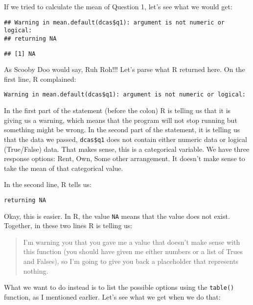 \documentclass[]{article}
\newenvironment{Shaded}{\begin{snugshade}}{\end{snugshade}}
\newcommand{\KeywordTok}[1]{\textcolor[rgb]{0.13,0.29,0.53}{\textbf{{#1}}}}
\newcommand{\NormalTok}[1]{{#1}}
\begin{document}
If we tried to calculate the mean of Question 1, let's see what we would
get:

\begin{Shaded}
\end{Shaded}

\begin{verbatim}
## Warning in mean.default(dcas$q1): argument is not numeric or logical:
## returning NA
\end{verbatim}

\begin{verbatim}
## [1] NA
\end{verbatim}

As Scooby Doo would say, Ruh Roh!!! Let's parse what R returned here. On
the first line, R complained:

\begin{verbatim}
Warning in mean.default(dcas$q1): argument is not numeric or logical:
\end{verbatim}

In the first part of the statement (before the colon) R is telling us
that it is giving us a warning, which means that the program will not
stop running but something might be wrong. In the second part of the
statement, it is telling us that the data we passed, \texttt{dcas\$q1}
does not contain either numeric data or logical (True/False) data. That
makes sense, this is a categorical variable. We have three response
options: Rent, Own, Some other arrangement. It doesn't make sense to
take the mean of that categorical value.

In the second line, R tells us:

\begin{verbatim}
returning NA
\end{verbatim}

Okay, this is easier. In R, the value \texttt{NA} means that the value
does not exist. Together, in these two lines R is telling us:

\begin{quote}
I'm warning you that you gave me a value that doesn't make sense with
this function (you should have given me either numbers or a list of
Trues and Falses), so I'm going to give you back a placeholder that
represents nothing.
\end{quote}

What we want to do instead is to list the possible options using the
\texttt{table()} function, as I mentioned earlier. Let's see what we get
when we do that:
\end{document}
